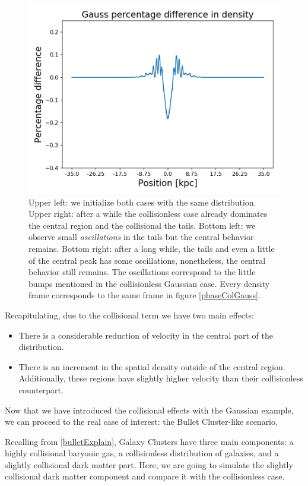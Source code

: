 \begin{figure}[h!]
    \includegraphics[scale=0.45]{imag/cGaussD62.png}
    \caption{Upper left: we initialize both cases with the same distribution. Upper right: after a while the collisionless case already dominates the central region and the collisional the tails. Bottom left: we observe small \emph{oscillations} in the tails but the central behavior remains. Bottom right: after a long while, the tails and even a little of the central peak has some oscillations, nonetheless, the central behavior still remains. The oscillations correspond to the little bumps mentioned in the collisionless Gaussian case. Every density frame corresponds to the same frame in figure \ref{phaseColGauss}.}
    \label{densColGauss}
\end{figure}

Recapitulating, due to the collisional term we have two main effects:
\begin{itemize}
\item There is a considerable reduction of velocity in the central part of the distribution.
\item There is an increment in the spatial density outside of the central region. Additionally, these regions have slightly higher velocity than their collisionless counterpart.
\end{itemize}

Now that we have introduced the collisional effects with the Gaussian example, we can proceed to the real case of interest: the Bullet Cluster-like scenario. 

Recalling from \ref{bulletExplain}, Galaxy Clusters have three main components: a highly collisional baryonic gas, a collisionless distribution of galaxies, and a slightly collisional dark matter part. Here, we are going to simulate the slightly collisional dark matter component and compare it with the collisionless case.%


